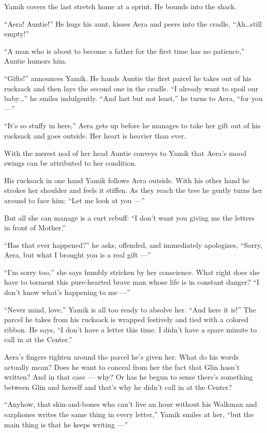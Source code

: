 \documentclass[twoside,11pt,openany]{book}
\begin{document}
Yamik covers the last stretch home at a sprint. He bounds into the shack.

``Aera! Auntie!'' He hugs his aunt, kisses Aera and peers into the cradle,
``Ah{\ldots}still empty!''

``A man who is about to become a father for the first time has no patience,'' Auntie humors
him.

``Gifts!'' announces Yamik. He hands Auntie the first parcel he takes out of his rucksack and
then lays the second one in the cradle. ``I already want to spoil our baby{\ldots}'' he smiles indulgently.
``And last but not least,'' he turns to Aera, ``for you ---''

``It's so stuffy in here,'' Aera gets up before he manages to take her gift out of his
rucksack and goes outside. Her heart is heavier than ever.

With the merest nod of her head Auntie conveys to Yamik that Aera's
mood swings can be attributed to her condition.

His rucksack in one hand Yamik follows Aera outside. With his other hand he strokes her shoulder and feels it stiffen.
As they reach the tree he gently turns her around to face him: ``Let me look at you ---''

But all she can manage is a curt rebuff:   ``I don't want you giving me the letters in front of
Mother.''

``Has that ever happened?'' he asks, offended, and immediately apologizes,
``Sorry, Aera, but what I brought you is a real gift ---''

``I'm sorry too,'' she says humbly stricken by her conscience. What right does she have to
torment this pure-hearted brave man whose life is in constant danger? ``I don't know what's happening to
me ---''

``Never mind, love,'' Yamik is all too ready to absolve her. ``And here it
is!'' The parcel he takes from his rucksack is wrapped festively and tied with a colored ribbon. He says,
``I don't have a letter this time. I didn't have a spare minute to call in at the Center.''

Aera's fingers tighten around the parcel he's given her. What do his words actually mean? Does he want to conceal from
her the fact that Glin hasn't written? And in that case --- why? Or has he begun to sense there's something between Glin
and herself and that's why he didn't call in at the Center?

``Anyhow, that skin-and-bones who can't live an hour without his Walkman and earphones writes the same
thing in every letter,'' Yamik smiles at her, ``but the main thing is that he
 keeps  writing ---''
\end{document}
